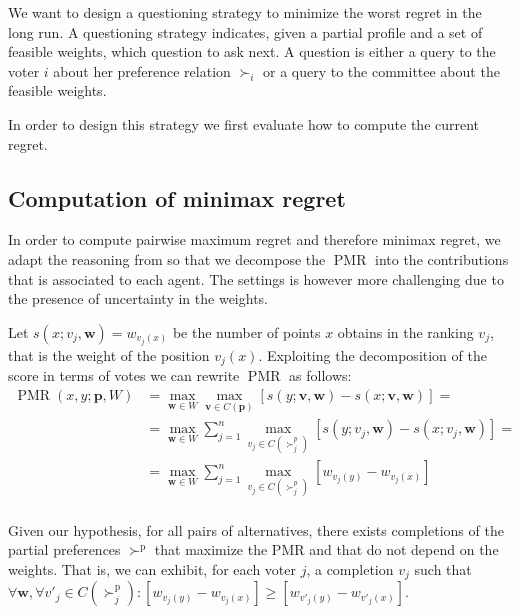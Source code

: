 \documentclass[12pt]{article}
\newcommand{\ppref}{\succ^\text{p}}%
\newcommand{\profile}{\textbf{v}}%
\newcommand{\pprofile}{\textbf{p}}%
\newcommand{\w}{\textbf{w}}%
\DeclareMathOperator{\PMR}{PMR}
\begin{document}
We want to design a questioning strategy to minimize the worst regret in the long run. A questioning strategy indicates, given a partial profile and a set of feasible weights, which question to ask next. A question is either a query to the voter $i$ about her preference relation $\succ_i$ or a query to the committee about the feasible weights. 

In order to design this strategy we first evaluate how to compute the current regret.

\subsection{Computation of minimax regret}

In order to compute pairwise maximum regret and therefore minimax regret, we adapt the reasoning from \cite{Lu2011} so that we decompose the $\PMR$ into the contributions that is associated to each agent.
The settings is however more challenging due to the presence of uncertainty in the weights.

Let $s(x; v_j,\w)=w_{v_j(x)}$ be the number of points $x$ obtains in the ranking $v_j$, that is the weight of the position $v_j(x)$.
Exploiting the decomposition of the score in terms of votes we can rewrite $\PMR$ as follows:
\begin{align*}
\PMR(x,y; \pprofile, W) &= \max_{\w \in W} \max_{\profile \in C(\pprofile)} [ s(y; \profile,\w) - s(x; \profile,\w) ] = \\
&=  \max_{\w \in W} \sum_{j=1}^{n} \max_{v_j \in C(\succ_j^p)} [s(y; v_j,\w) - s(x; v_j,\w)]=\\
&=  \max_{\w \in W} \sum_{j=1}^{n} \max_{v_j \in C(\succ_j^p)} [w_{v_j(y)} - w_{v_j(x)}] \\
\end{align*}

Given our hypothesis, for all pairs of alternatives, there exists completions of the partial preferences $\ppref$ that maximize the PMR and that do not depend on the weights. That is, we can exhibit, for each voter $j$, a completion $v_j$ such that $\forall \w, \forall v'_j \in C(\ppref_j): [w_{v_j(y)} - w_{v_j(x)}] \geq [w_{v'_j(y)} - w_{v'_j(x)}]$.
\end{document}
